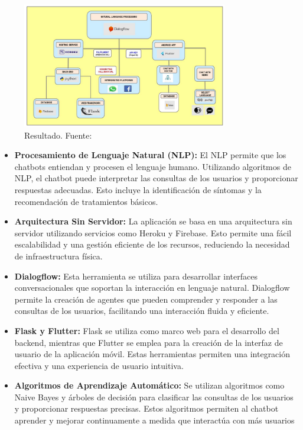	\begin{figure}[H]
		\begin{center}
			\includegraphics[width=0.8\textwidth]{2/1_antecedentes/Intelligent-FundaTteo.png}
			\caption{Resultado. Fuente: \cite{IntelligentChatbot_2020}}
		\end{center}
	\end{figure}
	\vspace{-10mm}
	
		\begin{itemize}
		\item \textbf{Procesamiento de Lenguaje Natural (NLP):} El NLP permite que los chatbots entiendan y procesen el lenguaje humano. Utilizando algoritmos de NLP, el chatbot puede interpretar las consultas de los usuarios y proporcionar respuestas adecuadas. Esto incluye la identificación de síntomas y la recomendación de tratamientos básicos.
	
		\item \textbf{Arquitectura Sin Servidor:} La aplicación se basa en una arquitectura sin servidor utilizando servicios como Heroku y Firebase. Esto permite una fácil escalabilidad y una gestión eficiente de los recursos, reduciendo la necesidad de infraestructura física.
	
		\item \textbf{Dialogflow:} Esta herramienta se utiliza para desarrollar interfaces conversacionales que soportan la interacción en lenguaje natural. Dialogflow permite la creación de agentes que pueden comprender y responder a las consultas de los usuarios, facilitando una interacción fluida y eficiente.
	
		\item \textbf{Flask y Flutter:} Flask se utiliza como marco web para el desarrollo del backend, mientras que Flutter se emplea para la creación de la interfaz de usuario de la aplicación móvil. Estas herramientas permiten una integración efectiva y una experiencia de usuario intuitiva.
	
		\item \textbf{Algoritmos de Aprendizaje Automático:} Se utilizan algoritmos como Naive Bayes y árboles de decisión para clasificar las consultas de los usuarios y proporcionar respuestas precisas. Estos algoritmos permiten al chatbot aprender y mejorar continuamente a medida que interactúa con más usuarios
		\end{itemize}


